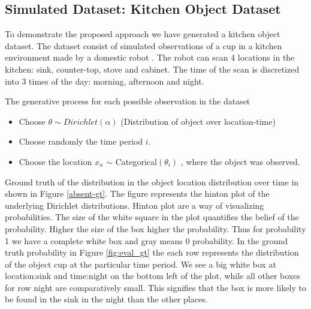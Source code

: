 \subsection{Simulated Dataset: Kitchen Object Dataset}

To demonstrate the proposed approach we have generated a kitchen object dataset. The dataset consist of simulated observations of a cup in a kitchen environment made by a domestic robot \cite{fig:eval_cup}. The robot can scan 4 locations in the kitchen: sink, counter-top, stove and cabinet. The time of the scan is discretized into 3 times of the day: morning, afternoon and night. 

The generative process for each possible observation in the dataset 
\begin{itemize}
    \item Choose $ \theta \sim Dirichlet(\alpha)$ (Distribution of object over location-time)
    \item Choose randomly the time period $i$.
	\item Choose the location $x_n$ $\sim$ Categorical$(\theta_i)$ , where the object was observed.
	\end{itemize}

Ground truth of the distribution in the object location distribution over time in shown in Figure \ref{absent-gt}. The figure represents the hinton plot of the underlying Dirichlet distributions. Hinton plot are a way of visualizing probabilities. The size of the white square in the plot quantifies the belief of the probability. Higher the size of the box higher the probability. Thus for probability 1 we have a complete white box and gray means 0 probability. In the ground truth probability in Figure \ref{fig:eval_gt} the each row represents the distribution of the object cup at the particular time period. We see a big white box at location:sink and time:night on the bottom left of the plot, while all other boxes for row night are comparatively small. This signifies that the box is more likely to be found in the sink in the night than the other places.

